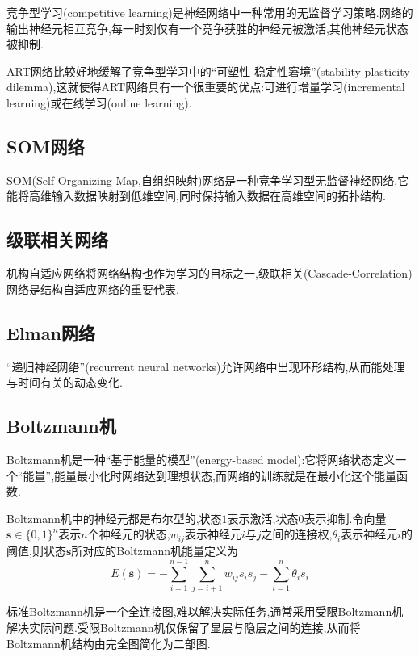 竞争型学习(competitive learning)是神经网络中一种常用的无监督学习策略.网络的输出神经元相互竞争,每一时刻仅有一个竞争获胜的神经元被激活,其他神经元状态被抑制.

ART网络比较好地缓解了竞争型学习中的``可塑性-稳定性窘境''(stability-plasticity dilemma),这就使得ART网络具有一个很重要的优点:可进行增量学习(incremental learning)或在线学习(online learning).

\subsection{SOM网络}

SOM(Self-Organizing Map,自组织映射)网络是一种竞争学习型无监督神经网络,它能将高维输入数据映射到低维空间,同时保持输入数据在高维空间的拓扑结构.

\subsection{级联相关网络}

机构自适应网络将网络结构也作为学习的目标之一,级联相关(Cascade-Correlation)网络是结构自适应网络的重要代表.

\subsection{Elman网络}

``递归神经网络''(recurrent neural networks)允许网络中出现环形结构,从而能处理与时间有关的动态变化.

\subsection{Boltzmann机}

Boltzmann机是一种``基于能量的模型''(energy-based model):它将网络状态定义一个``能量'',能量最小化时网络达到理想状态,而网络的训练就是在最小化这个能量函数.

Boltzmann机中的神经元都是布尔型的,状态$1$表示激活,状态$0$表示抑制.令向量$\mathbf s\in\{0,1\}^n$表示$n$个神经元的状态,$w_{ij}$表示神经元$i$与$j$之间的连接权,$\theta_i$表示神经元$i$的阈值,则状态$\mathbf s$所对应的Boltzmann机能量定义为
\begin{equation}
E(\mathbf s)=-\sum_{i=1}^{n-1}\sum_{j=i+1}^nw_{ij}s_is_j-\sum_{i=1}^n\theta_is_i\end{equation}

标准Boltzmann机是一个全连接图,难以解决实际任务,通常采用受限Boltzmann机解决实际问题.受限Boltzmann机仅保留了显层与隐层之间的连接,从而将Boltzmann机结构由完全图简化为二部图.


